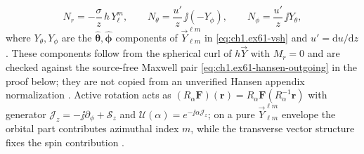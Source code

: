 \begin{equation}
\label{eq:ch1.ex61-hansen-surface}
N_r=-\frac{\sigma}{z}\,h\,Y_\ell^m,\qquad
N_\theta=\frac{u'}{z}\,\jj(-Y_\phi),\qquad
N_\phi=\frac{u'}{z}\,\jj Y_\theta,
\end{equation}
where $Y_\theta,Y_\phi$ are the $\hat{\boldsymbol{\theta}},\hat{\boldsymbol{\phi}}$ components of $\vec Y_{\ell m}^{\ell m}$ in \eqref{eq:ch1.ex61-vsh} and $u'=\mathrm{d}u/\mathrm{d}z$. These components follow from the spherical curl of $h\vec Y$ with $M_r=0$ and are checked against the source-free Maxwell pair \eqref{eq:ch1.ex61-hansen-outgoing} in the proof below; they are not copied from an unverified Hansen appendix normalization \cite{stratton1941,jackson1999}. Active rotation acts as $(R_\alpha\mathbf F)(\mathbf r)=R_\alpha\mathbf F(R_\alpha^{-1}\mathbf r)$ with generator $\mathcal{J}_z=-\jj\partial_\phi+\mathcal{S}_z$ and $\mathcal{U}(\alpha)=e^{-\jj\alpha\mathcal{J}_z}$; on a pure $\vec Y_{\ell m}^{\ell m}$ envelope the orbital part contributes azimuthal index $m$, while the transverse vector structure fixes the spin contribution \cite{stratton1941}.

